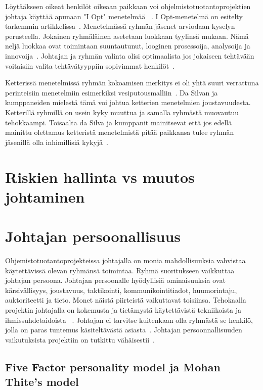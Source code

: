 \documentclass[finnish]{tktltiki2}
\theoremstyle{definition}
\theoremstyle{remark}
\begin{document}
Löytääkseen oikeat henkilöt oikeaan paikkaan voi ohjelmistotuotantoprojektien johtaja käyttää apunaan "I Opt" menetelmää ~\cite{Dhomne:2012:ITL:2382887.2382899}. I Opt-menetelmä on esitelty tarkemmin artikkelissa~\cite{ kliem1996teambuilding}. Menetelmässä ryhmän jäsenet arviodaan kyselyn perusteella. Jokainen ryhmäläinen asetetaan luokkaan tyylinsä mukaan. Nämä neljä luokkaa ovat toimintaan suuntautunut, looginen prosessoija, analysoija ja innovoija~\cite{ kliem1996teambuilding}. Johtajan ja ryhmän valinta olisi optimaalista jos jokaiseen tehtävään voitaisiin valita tehtävätyyppiin sopivimmat henkilöt~\cite{Dhomne:2012:ITL:2382887.2382899}.

Ketterissä menetelmissä ryhmän kokoamisen merkitys ei oli yhtä suuri verrattuna perinteisiin menetelmiin esimerkiksi vesiputousmalliin~\cite{daSilva2012}. Da Silvan ja kumppaneiden mielestä tämä voi johtua ketterien menetelmien joustavuudesta. Ketterillä ryhmillä on usein kyky muuttua ja samalla ryhmästä muovautuu tehokkaampi. Toisaalta da Silva ja kumppanit mainitsevat että jos edellä mainittu olettamus ketteristä menetelmistä pitää paikkansa tulee ryhmän jäsenillä olla inhimillisiä kykyjä~\cite{daSilva2012}. 


\section{Riskien hallinta vs muutos johtaminen}


\section{Johtajan persoonallisuus}

Ohjemistotuotantoprojekteissa johtajalla on monia mahdollisuuksia vahvistaa käytettävissä olevan ryhmänsä toimintaa. Ryhmä suoritukseen vaikkuttaa johtajan persoona. Johtajan persoonalle hyödyllisiä ominaisuuksia ovat kärsivällisyys, joustavuus, taktikointi, kommunikointitiadot, huumorintaju, auktoriteetti ja tieto. Monet näistä piirteistä vaikuttavat toisiinsa. Tehokaalla projektin johtajalla on kokemusta ja tietämystä käytettävistä tekniikoista ja ihmissuhdetaidoista ~\cite{McLeod:2011:FAS:1978802.1978803}. Johtajan ei tarvitse kuitenkaan olla ryhmästä se henkilö, jolla on paras tuntemus käsiteltävästä asiasta~\cite{4017705}. Johtajan persoonnallisuuden vaikutuksista projektiin on tutkittu vähäisestii~\cite{Wang:2009:PMP:1639950.1640049}. 

\subsection{Five Factor personality model ja Mohan Thite's model }
\end{document}
